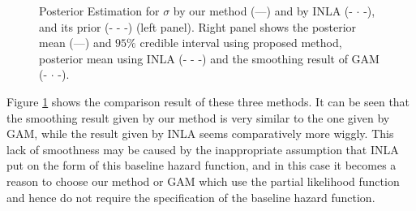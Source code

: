 \documentclass[]{article}
\begin{document}
\begin{figure}[ht]
\centering
{}

\caption{Posterior Estimation for $\sigma$ by our method (---) and by INLA (- $\cdot$ -), and its prior (- - -)  (left panel). Right panel shows the posterior mean (---) and $95\%$ credible interval using proposed method, posterior mean using INLA (- - -) and the smoothing result of GAM (- $\cdot$ -).}
\label{fig:leuk}
\end{figure}


Figure \ref{fig:leuk} shows the comparison result of these three methods. It can be seen that the smoothing result given by our method is very similar to the one given by GAM, while the result given by INLA seems comparatively more wiggly. This lack of smoothness may be caused by the inappropriate assumption that INLA put on the form of this baseline hazard function, and in this case it becomes a reason to choose our method or GAM which use the partial likelihood function and hence do not require the specification of the baseline hazard function.
\end{document}
